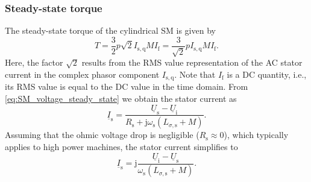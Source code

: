 \begin{frame}
	\frametitle{Steady-state torque} 
	The steady-state torque of the cylindrical SM is given by
	$$ T = \frac{3}{2} p \sqrt{2}I_\mathrm{s,q} M I_\mathrm{f} = \frac{3}{\sqrt{2}} p I_\mathrm{s,q} M I_\mathrm{f}.$$
	Here, the factor $\sqrt{2}$ results from the RMS value representation of the AC stator current in the complex phasor component $I_\mathrm{s,q}$. Note that $I_\mathrm{f}$ is a DC quantity, i.e., its RMS value is equal to the DC value in the time domain. 
	From \eqref{eq:SM_voltage_steady_state} we obtain the stator current as
	\begin{equation}
	\underline{I}_\mathrm{s} = \frac{\underline{U}_\mathrm{s} - \underline{U}_\mathrm{i}}{R_\mathrm{s} + \mathrm{j}\omega_\mathrm{s} \left(L_{\sigma,\mathrm{s}} + M\right)}.
	\end{equation}
	Assuming that the ohmic voltage drop is negligible ($R_\mathrm{s}\approx 0$), which typically applies to high power machines, the stator current simplifies to
	\begin{equation}
		\underline{I}_\mathrm{s} = \mathrm{j} \frac{\underline{U}_\mathrm{i} - \underline{U}_\mathrm{s}}{\omega_\mathrm{s} \left(L_{\sigma,\mathrm{s}} + M\right)}.
		\label{eq:SM_stator_current_steady_state}
	\end{equation}
\end{frame}

